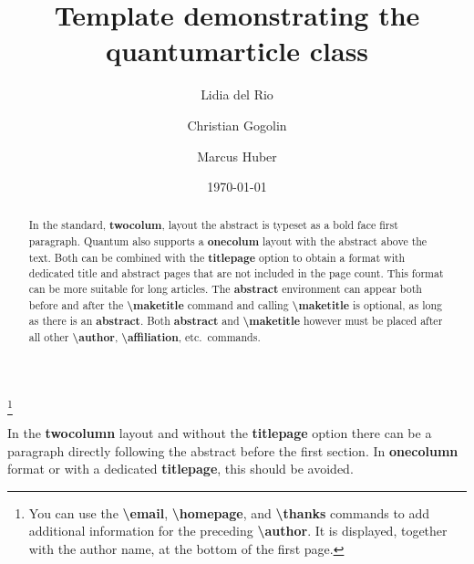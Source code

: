 \documentclass[prx,a4paper,aps,twocolumn,superscriptaddress,11pt]{quantumarticle}
\begin{document}
\title{Template demonstrating the quantumarticle class}
\date{\today}
\author{Lidia del Rio}
\author{Christian Gogolin}
\thanks{You can use the \textbf{\textbackslash{}email}, \textbf{\textbackslash{}homepage}, and \textbf{\textbackslash{}thanks} commands to add additional information for the preceding \textbf{\textbackslash{}author}. It is displayed, together with the author name, at the bottom of the first page.}
\author{Marcus Huber}

\maketitle

\begin{abstract}
  In the standard, \textbf{twocolum}, layout the abstract is typeset as a bold face first paragraph.
  Quantum also supports a \textbf{onecolum} layout with the abstract above the text.
  Both can be combined with the \textbf{titlepage} option to obtain a format with dedicated title and abstract pages that are not included in the page count. 
  This format can be more suitable for long articles.
  The \textbf{abstract} environment can appear both before and after the \textbf{\textbackslash{}maketitle} command and calling \textbf{\textbackslash{}maketitle} is optional, as long as there is an \textbf{abstract}.
  Both \textbf{abstract} and \textbf{\textbackslash{}maketitle} however must be placed after all other \textbf{\textbackslash{}author}, \textbf{\textbackslash{}affiliation}, etc.\ commands.
\end{abstract}


In the \textbf{twocolumn} layout and without the \textbf{titlepage} option there can be a paragraph directly following the abstract before the first section.
In \textbf{onecolumn} format or with a dedicated \textbf{titlepage}, this should be avoided.
\end{document}
